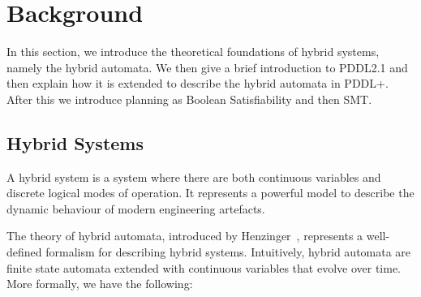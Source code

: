 \section{Background}\label{sec:background}

In this section, we introduce the theoretical foundations of hybrid systems, namely the hybrid automata. We then give a brief introduction to PDDL2.1 and then explain how it is extended to describe the hybrid automata in PDDL+. After this we introduce planning as Boolean Satisfiability and then SMT.

\subsection{Hybrid Systems}

A hybrid system is a system where there are both continuous variables and discrete logical modes of operation. It represents a powerful model to describe the dynamic behaviour of modern engineering artefacts. %

The theory of hybrid automata, introduced by Henzinger~\cite{henzinger}, represents a well-defined formalism for describing hybrid systems. Intuitively, hybrid automata are finite state automata extended with continuous variables that evolve over time. More formally, we have the following:


